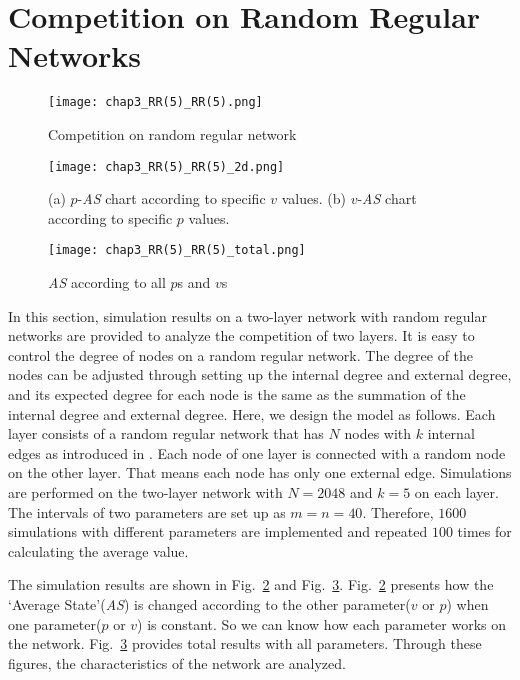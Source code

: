 \section{Competition on Random Regular Networks}
\label{competition on Random Regular Networks}
\begin{figure}[!htb]
	\centering
	\texttt{[image: chap3\_RR(5)\_RR(5).png]}
	\caption{Competition on random regular network}
	\label{chap3_RR(5)_RR(5)}
\end{figure}
\begin{figure}[!htb]
	\centering
	\texttt{[image: chap3\_RR(5)\_RR(5)\_2d.png]}
	\caption{(a) $p$-\textit{AS} chart according to specific $v$ values. (b) $v$-\textit{AS} chart according to specific $p$ values.}
	\label{chap3_RR(5)_RR(5)_2d}
\end{figure}
\begin{figure}[!htb]
	\centering
	\texttt{[image: chap3\_RR(5)\_RR(5)\_total.png]}
	\caption{\textit{AS} according to all $p$s and $v$s}
	\label{chap3_RR(5)_RR(5)_total}
\end{figure}

In this section, simulation results on a two-layer network with random regular networks are provided to analyze the competition of two layers. It is easy to control the degree of nodes on a random regular network. The degree of the nodes can be adjusted through setting up the internal degree and external degree, and its expected degree for each node is the same as the summation of the internal degree and external degree. Here, we design the model as follows. Each layer consists of a random regular network that has $N$ nodes with $k$ internal edges as introduced in \parencite{kimsangwoo2012, choi2011, bela2001}. Each node of one layer is connected with a random node on the other layer. That means each node has only one external edge. Simulations are performed on the two-layer network with $N=2048$ and $k=5$ on each layer. The intervals of two parameters are set up as $m = n = 40$. Therefore, $1600$ simulations with different parameters are implemented and repeated $100$ times for calculating the average value. 

The simulation results are shown in Fig.~\ref{chap3_RR(5)_RR(5)_2d} and Fig.~\ref{chap3_RR(5)_RR(5)_total}.  Fig.~\ref{chap3_RR(5)_RR(5)_2d} presents how the `Average State'(\textit{AS}) is changed according to the other parameter($v$ or $p$) when one parameter($p$ or $v$) is constant. So we can know how each parameter works on the network. Fig.~\ref{chap3_RR(5)_RR(5)_total} provides total results with all parameters. Through these figures, the characteristics of the network are analyzed.

